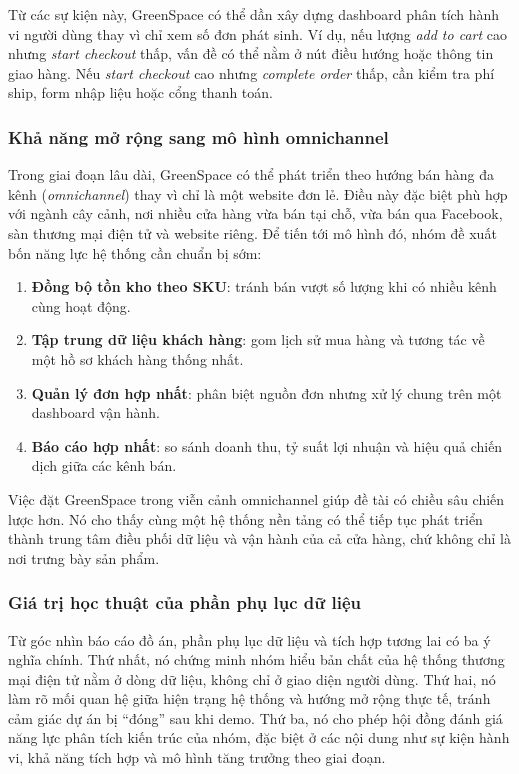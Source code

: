 \documentclass[11pt, a4paper]{article}
\begin{document}
Từ các sự kiện này, GreenSpace có thể dần xây dựng dashboard phân tích hành vi người dùng
thay vì chỉ xem số đơn phát sinh. Ví dụ, nếu lượng \textit{add to cart} cao nhưng \textit{start checkout}
thấp, vấn đề có thể nằm ở nút điều hướng hoặc thông tin giao hàng. Nếu \textit{start checkout} cao nhưng
\textit{complete order} thấp, cần kiểm tra phí ship, form nhập liệu hoặc cổng thanh toán.

\subsubsection{Khả năng mở rộng sang mô hình omnichannel}

Trong giai đoạn lâu dài, GreenSpace có thể phát triển theo hướng bán hàng đa kênh
(\textit{omnichannel}) thay vì chỉ là một website đơn lẻ. Điều này đặc biệt phù hợp với
ngành cây cảnh, nơi nhiều cửa hàng vừa bán tại chỗ, vừa bán qua Facebook, sàn thương mại điện tử
và website riêng. Để tiến tới mô hình đó, nhóm đề xuất bốn năng lực hệ thống cần chuẩn bị sớm:

\begin{enumerate}[leftmargin=*]
    \item \textbf{Đồng bộ tồn kho theo SKU}: tránh bán vượt số lượng khi có nhiều kênh cùng hoạt động.
    \item \textbf{Tập trung dữ liệu khách hàng}: gom lịch sử mua hàng và tương tác về một hồ sơ khách hàng thống nhất.
    \item \textbf{Quản lý đơn hợp nhất}: phân biệt nguồn đơn nhưng xử lý chung trên một dashboard vận hành.
    \item \textbf{Báo cáo hợp nhất}: so sánh doanh thu, tỷ suất lợi nhuận và hiệu quả chiến dịch giữa các kênh bán.
\end{enumerate}

Việc đặt GreenSpace trong viễn cảnh omnichannel giúp đề tài có chiều sâu chiến lược hơn.
Nó cho thấy cùng một hệ thống nền tảng có thể tiếp tục phát triển thành trung tâm điều phối dữ liệu
và vận hành của cả cửa hàng, chứ không chỉ là nơi trưng bày sản phẩm.

\subsubsection{Giá trị học thuật của phần phụ lục dữ liệu}

Từ góc nhìn báo cáo đồ án, phần phụ lục dữ liệu và tích hợp tương lai có ba ý nghĩa chính.
Thứ nhất, nó chứng minh nhóm hiểu bản chất của hệ thống thương mại điện tử nằm ở dòng dữ liệu,
không chỉ ở giao diện người dùng. Thứ hai, nó làm rõ mối quan hệ giữa hiện trạng hệ thống và
hướng mở rộng thực tế, tránh cảm giác dự án bị ``đóng'' sau khi demo. Thứ ba, nó cho phép hội đồng
đánh giá năng lực phân tích kiến trúc của nhóm, đặc biệt ở các nội dung như sự kiện hành vi,
khả năng tích hợp và mô hình tăng trưởng theo giai đoạn.
\end{document}

